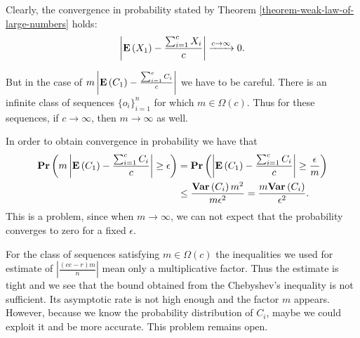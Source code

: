 Clearly, the convergence in probability stated by Theorem \ref{theorem-weak-law-of-large-numbers} holds:
\[
	\left|\mathbf{E}\left(X_1\right) - \frac{\sum\displaylimits_{i = 1}^{c} X_i}{c}\right| \xrightarrow{c \rightarrow \infty} 0 \text{.}
\]

But in the case of $m \left|\mathbf{E}\left(C_1\right) - \frac{\sum\displaylimits_{i = 1}^{c} C_i}{c}\right|$ we have to be careful. There is an infinite class of sequences $\{o_i\}_{i = 1}^{n}$ for which $m \in \Omega(c)$. Thus for these sequences, if $c \rightarrow \infty$, then $m \rightarrow \infty$ as well.

In order to obtain convergence in probability we have that
\[
\begin{split}
\mathbf{Pr}\left(m \left|\mathbf{E}\left(C_1\right) - \frac{\sum\displaylimits_{i = 1}^{c} C_i}{c}\right| \geq \epsilon\right) 
	& = \mathbf{Pr}\left(\left|\mathbf{E}\left(C_1\right) - \frac{\sum\displaylimits_{i = 1}^{c} C_i}{c}\right| \geq \frac{\epsilon}{m}\right)  \\
	& \leq \frac{\mathbf{Var}\left(C_i\right) m ^ 2}{m \epsilon ^ 2} = \frac{m\mathbf{Var}\left(C_i\right)}{\epsilon ^ 2} \text{.}
\end{split}
\]
This is a problem, since when $m \rightarrow \infty$, we can not expect that the probability converges to zero for a fixed $\epsilon$.

For the class of sequences satisfying $m \in \Omega(c)$ the inequalities we used for estimate of $\left|\frac{(ce - r)m}{n}\right|$ mean only a multiplicative factor. Thus the estimate is tight and we see that the bound obtained from the Chebyshev's inequality is not sufficient. Its asymptotic rate is not high enough and the factor $m$ appears. However, because we know the probability distribution of $C_i$, maybe we could exploit it and be more accurate. This problem remains open.
